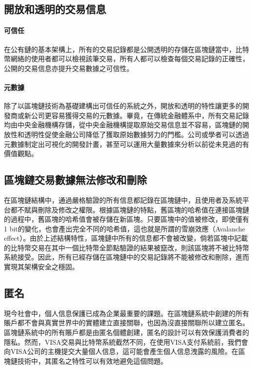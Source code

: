 		\subsection{開放和透明的交易信息}

			\paragraph{可信任}在公有鏈的基本架構上，所有的交易記錄都是公開透明的存儲在區塊鏈當中，比特幣網絡的使用者都可以檢視該筆交易，所有人都可以檢查每個交易記錄的正確性，公開的交易信息亦提升交易數據之可信性。
			\paragraph{元數據}除了以區塊鏈技術為基礎建構出可信任的系統之外，開放和透明的特性讓更多的開發商或新公司更容易獲得交易的元數據。畢竟，在傳統金融體系中，所有交易記錄均由中央金融機構存儲，從中央金融機構提取原始交易信息並不容易，區塊鏈的開放性和透明性促使金融公司降低了獲取原始數據努力的門檻。公司或學者可以透過元數據制定出可視化的開發計畫，甚至可以運用大量數據來分析以前從未見過的有價值觀點。

		\subsection{區塊鏈交易數據無法修改和刪除}在區塊鏈結構中，通過嚴格驗證的所有信息都記錄在區塊鏈中，且使用者及系統平台都不賦與刪除及修改之權限。根據區塊鏈的特點，舊區塊的哈希值在連接區塊鏈的過程中，舊區塊的哈希值會被存儲在新區塊。只要區塊中的值被修改，即使僅有1 bit的變化，也會產出完全不同的哈希值，這也就是所謂的雪崩效應（Avalanche effect）\supercite{Theuseofbentsequencestoachievehigher-orderstrictavalanchecriterioninS-boxdesign}。由於上述結構特性，區塊鏈中所有的信息都不會被改變，倘若區塊中記載的比特幣交易在其中一個比特幣全節點驗證的結果被竄改，則該區塊將不被比特幣系統接受。因此，所有已經存儲在區塊鏈中的交易記錄將不能被修改和刪除，進而實現其架構安全之穩固。

		\subsection{匿名}現今社會中，個人信息保護已成為企業最重要的課題。在區塊鏈系統中創建的所有賬戶都不會與真實世界中的實體建立直接關聯，也因為沒直接關聯所以建立匿名。區塊鏈系統中的所有賬戶都是由匿名個體創建，匿名的設計可以有效保護消費者的隱私。然而，VISA交易與比特幣系統截然不同，在使用VISA支付系統前，我們會向VISA公司的主機提交大量個人信息，這可能會產生個人信息洩露的風險。在區塊鏈技術中，其匿名之特性可以有效地避免這個問題。


